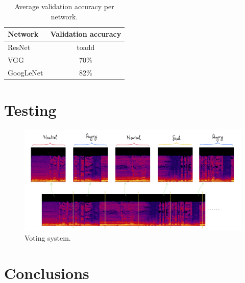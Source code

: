 \documentclass[10pt,twocolumn,letterpaper]{article}
\begin{document}
\begin{table}
   \begin{center}
   \begin{tabular}{l|c}
   Network & Validation accuracy \\
   \hline
   ResNet & toadd  \\
   \hline
   VGG & 70\% \\
   \hline
   GoogLeNet & 82\% \\
   \end{tabular}
   \end{center}
   \caption{Average validation accuracy per network.}
   \label{tab:accuracy}
   \end{table}

\section{Testing}

\begin{figure}
   \begin{center}
   \includegraphics[width=0.8\linewidth]{img/voting-system}
   \end{center}
      \caption{Voting system.}
   \label{fig:voting}
   \end{figure}

\section{Conclusions}



{\small


}
\end{document}
